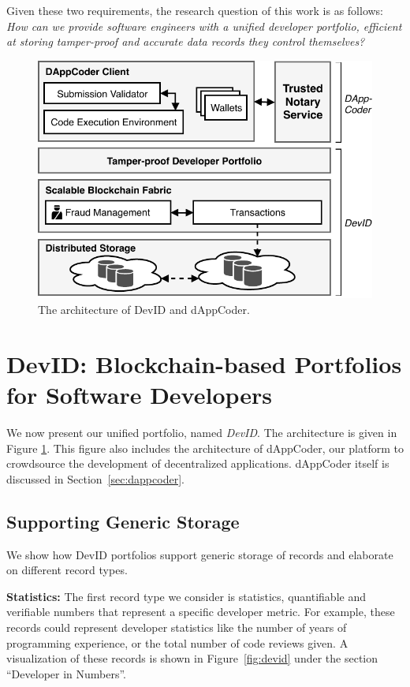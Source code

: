 Given these two requirements, the research question of this work is as follows:
\textit{How can we provide software engineers with a unified developer portfolio, efficient at storing tamper-proof and accurate data records they control themselves?}
\begin{figure}[t!]
	\centering
	\includegraphics[width=.8\linewidth]{devid/resources/architecture.pdf}
	\caption{The architecture of DevID and dAppCoder.}
	\label{fig:system_architecture}
\end{figure}

\section{DevID: Blockchain-based Portfolios for Software Developers}
\label{sec:devid_architecture}
We now present our unified portfolio, named \emph{DevID}.
The architecture is given in Figure \ref{fig:system_architecture}.
This figure also includes the architecture of dAppCoder, our platform to crowdsource the development of decentralized applications.
dAppCoder itself is discussed in Section~\ref{sec:dappcoder}.

\subsection{Supporting Generic Storage}
We show how DevID portfolios support generic storage of records and elaborate on different record types.

\textbf{Statistics:}
The first record type we consider is statistics, quantifiable and verifiable numbers that represent a specific developer metric.
For example, these records could represent developer statistics like the number of years of programming experience, or the total number of code reviews given.
A visualization of these records is shown in Figure~\ref{fig:devid} under the section \enquote{Developer in Numbers}.

